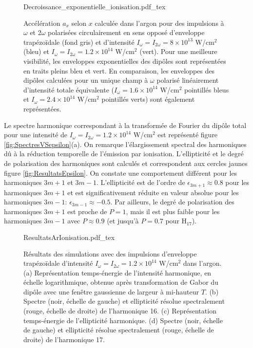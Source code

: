 \begin{figure}
\centering
\def\svgwidth{0.8\textwidth}
{Decroissance_exponentielle_ionisation.pdf_tex}
\caption{Accélération $a_x$ selon $x$ calculée dans l'argon pour des impulsions à $\omega$ et 2$\omega$ polarisées circulairement en sens opposé d'enveloppe trapézoïdale (fond gris) et d'intensité $I_\omega = I_{2\omega} = 8 \times 10^{13}$ W/cm$^2$ (bleu) et $I_\omega = I_{2\omega} = 1.2 \times 10^{14}$ W/cm$^2$ (vert). Pour une meilleure visibilité, les enveloppes exponentielles des dipôles sont représentées en traits pleins bleu et vert. En comparaison, les enveloppes des dipôles calculées pour un unique champ à $\omega$ polarisé linéairement d'intensité totale équivalente ($I_\omega = 1.6 \times 10^{14}$ W/cm$^2$ pointillés bleus et $I_\omega = 2.4 \times 10^{14}$ W/cm$^2$ pointillés verts) sont également représentées.}
\label{fig:Decroissance_exponentielle_ionisation}
\end{figure}

Le spectre harmonique correspondant à la transformée de Fourier du dipôle total pour une intensité de $I_\omega = I_{2\omega} = 1.2 \times 10^{14}$ W/cm$^2$ est représenté figure \ref{fig:SpectresVSepsilon}(a). On remarque l'élargissement spectral des harmoniques dû à la réduction temporelle de l'émission par ionisation. L'ellipticité et le degré de polarisation des harmoniques sont calculés et correspondent aux cercles jaunes figure \ref{fig:ResultatsEpsilon}. On constate une comportement différent pour les harmoniques $3m+1$ et $3m-1$. L'ellipticité est de l'ordre de $\epsilon_{3m+1} \approx 0.8$ pour les harmoniques $3m+1$ et est significativement réduite en valeur absolue pour les harmoniques $3m-1$: $\epsilon_{3m-1} \approx -0.5$. Par ailleurs, le degré de polarisation des harmoniques $3m+1$ est proche de $P = 1$, mais il est plus faible pour les harmoniques $3m-1$ avec $P \approx 0.9$ (et jusqu'à $P = 0.7$ pour H$_{17}$).

\begin{figure}
\centering
\def\svgwidth{\textwidth}
{ResultatsArIonisation.pdf_tex}
\caption{Résultats des simulations avec des impulsions d'enveloppe trapézoïdale d'intensité $I_\omega = I_{2\omega} = 1.2 \times 10^{14}$ W/cm$^2$ dans l'argon. (a) Représentation temps-énergie de l'intensité harmonique, en échelle logarithmique, obtenue après transformation de Gabor du dipôle avec une fenêtre gaussienne de largeur à mi-hauteur $T$. (b) Spectre (noir, échelle de gauche) et ellipticité résolue spectralement (rouge, échelle de droite) de l'harmonique 16. (c) Représentation temps-énergie de l'ellipticité harmonique. (d) Spectre (noir, échelle de gauche) et ellipticité résolue spectralement (rouge, échelle de droite) de l'harmonique 17.}
\label{fig:ResultatsArIonisation}
\end{figure}

